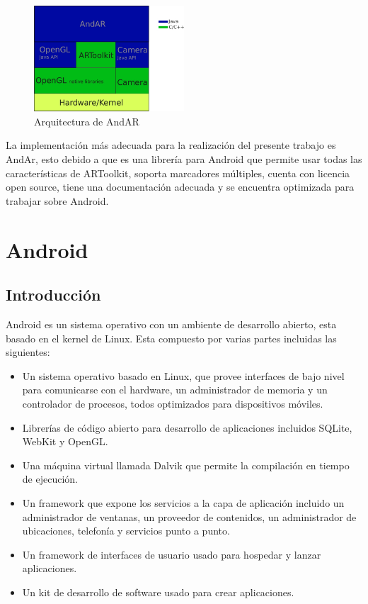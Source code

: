 \documentclass[12pt,a4paper,spanish,openany]{book}
\begin{document}
\begin{enumerate}
\begin{figure}
\begin{center}
 \includegraphics[width=0.5\textwidth]{./img/andAR.jpg}
\caption{Arquitectura de AndAR}
\end{center}
\end{figure}



\end{enumerate}

La implementación más adecuada para la realización del presente trabajo es
AndAr, esto debido a que es una librería para Android que permite usar todas las
características de ARToolkit, soporta marcadores múltiples, cuenta con licencia
open source, tiene una documentación adecuada y se encuentra optimizada para
trabajar sobre Android. %



\section{Android}

\subsection{Introducción}
Android es un sistema operativo con un ambiente de desarrollo abierto, esta
basado en el kernel de Linux.  Esta compuesto por varias partes incluidas las
siguientes:
\begin{itemize}
  \item Un sistema operativo basado en Linux, que provee interfaces de bajo
  nivel para comunicarse con el hardware, un administrador de memoria y un
  controlador de procesos, todos optimizados para dispositivos móviles.
  \item Librerías de código abierto para desarrollo de aplicaciones incluidos
  SQLite, WebKit y OpenGL.
  \item Una máquina virtual llamada Dalvik que permite la compilación en tiempo
  de ejecución.
  \item Un framework que expone los servicios a la capa de aplicación incluido
  un administrador de ventanas, un proveedor de contenidos, un administrador de
  ubicaciones, telefonía y servicios punto a punto.
  \item Un framework de interfaces de usuario usado para hospedar y lanzar
  aplicaciones.
  \item Un kit de desarrollo de software usado para crear aplicaciones.
\end{itemize}
\end{document}
